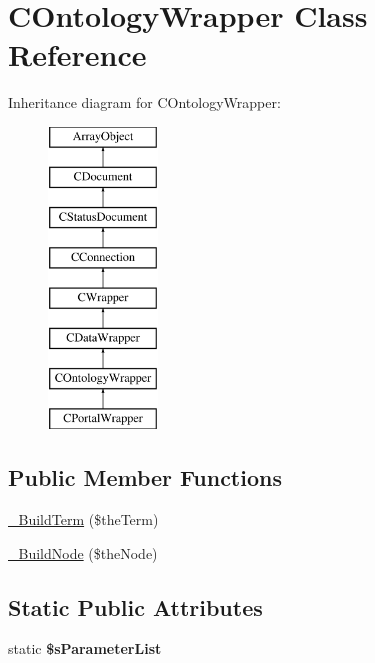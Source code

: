 \hypertarget{class_c_ontology_wrapper}{\section{C\-Ontology\-Wrapper Class Reference}
\label{class_c_ontology_wrapper}
}
Inheritance diagram for C\-Ontology\-Wrapper\-:\begin{figure}[H]
\begin{center}
\leavevmode
\includegraphics[height=8.000000cm]{class_c_ontology_wrapper}
\end{center}
\end{figure}
\subsection*{Public Member Functions}
\begin{DoxyCompactItemize}
\item 
\hyperlink{class_c_ontology_wrapper_a7d37edd771ffa60b36ead632c2e46534}{\-\_\-\-Build\-Term} (\$the\-Term)
\item 
\hyperlink{class_c_ontology_wrapper_a3149d34bb488513db2d572f3002bebce}{\-\_\-\-Build\-Node} (\$the\-Node)
\end{DoxyCompactItemize}
\subsection*{Static Public Attributes}
\begin{DoxyCompactItemize}
\item 
static {\bfseries \$s\-Parameter\-List}
\end{DoxyCompactItemize}
